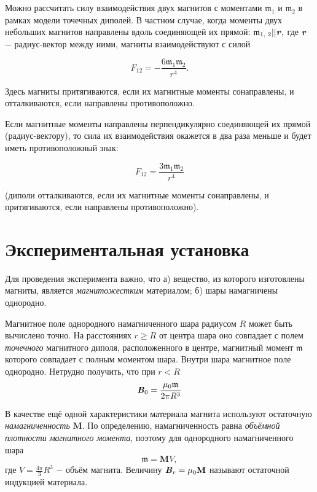 \documentclass[a4paper,12pt]{article} %
\begin{document}
\hfill \break Можно рассчитать силу взаимодействия двух магнитов с моментами $\mathfrak{m}_1$ и $\mathfrak{m}_2$ в рамках модели точечных диполей. В частном случае, когда моменты двух небольших магнитов направлены вдоль соединяющей их прямой: $\mathfrak{m}_\text{1, 2} || \textbf{\textit{r}},$ где $\textbf{\textit{r}}$ $-$ радиус-вектор между ними, магниты взаимодействуют с силой

$$
F_{12} = -\frac{6\mathfrak{m}_{1}\mathfrak{m}_{2}}{r^4}.
$$

\hfill \break Здесь магниты притягиваются, если их магнитные моменты сонаправлены, и отталкиваются, если направлены противоположно.

\hfill \break Если магнитные моменты направлены перпендикулярно соединяющей их прямой (радиус-вектору), то сила их взаимодействия окажется в два раза меньше и будет иметь противоположный знак:

$$
F_{12} = \frac{3\mathfrak{m}_{1}\mathfrak{m}_{2}}{r^4}
$$

\hfill \break (диполи отталкиваются, если их магнитные моменты сонаправлены, и притягиваются, если направлены противоположно).

\section{Экспериментальная установка}

 \hfill \break Для проведения эксперимента важно, что а) вещество, из которого изготовлены магниты, является \textit {магнитожестким} материалом; б) шары намагничены однородно. 

\hfill \break Магнитное поле однородного намагниченного шара радиусом $R$ может быть вычислено точно. На расстояниях $r \geq R$ от центра шара оно совпадает с полем \textit{точечного} магнитного диполя, расположенного в центре, магнитный момент $\mathfrak{m}$ которого совпадает с полным моментом шара. Внутри шара магнитное поле однородно. Hетрудно получить, что при $r < R$ \[\textbf{\textit{B}}_{0} = \frac{\mu_0 \mathfrak{m}}{2\pi R^3}\]

\hfill \break В качестве ещё одной характеристики материала магнита используют остаточную \textit {намагниченность} $\textbf{M}$. По определению, намагниченность равна \textit {объёмной плотности магнитного момента}, поэтому для однородного намагниченного шара $$\mathfrak{m}= \textbf{M}V ,$$ где $\displaystyle V = \frac{4\pi}{3}R^3$ $-$ объём магнита. Величину $\textbf{\textit{B}}_r = \mu_0 \textbf{M}$ называют остаточной индукцией материала.
\end{document}
